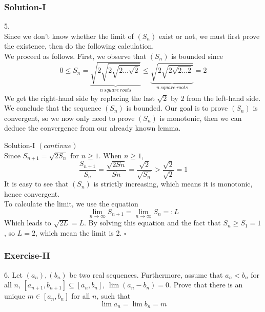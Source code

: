 \documentclass[12pt, t]{beamer}
\newcommand{\myqed}{\hfill$\square$}
\begin{document}
\begin{frame}
    \frametitle{Solution-I}
    5.\\
    \hspace{1em} Since we don't know whether the limit of $(S_n)$ exist or not, we must first prove the existence, then do the following
    calculation.\\
    \hspace{1em} We proceed as follows. First, we observe that $(S_n)$ is bounded since
    \begin{equation*}
        0\leq S_n=\underbrace{\sqrt{2\sqrt{2\sqrt{2\dots\sqrt{2}}}}}_{n\ square\ roots} \leq \underbrace{\sqrt{2\sqrt{2\sqrt{2\dots 2}}}}_{n\ square\ roots}=2
    \end{equation*}
    We get the right-hand side by replacing the last $\sqrt{2}$ by $2$
    from the left-hand side.\\
    \hspace{1em} We conclude that the sequence $(S_n)$ is bounded. Our goal is to prove $(S_n)$ is convergent, so we now only need to prove
    $(S_n)$ is monotonic, then we can deduce the convergence from our already known lemma.
\end{frame}

\begin{frame}{Solution-I}
    $(continue)$\\
    \hspace{1em} Since $S_{n+1}=\sqrt{2S_n}$ for $n\geq 1$. When $n\geq 1$,
    \begin{equation*}
        \frac{S_{n+1}}{S_n}=\frac{\sqrt{2Sn}}{Sn}=\frac{\sqrt{2}}{\sqrt{S_n}}>\frac{\sqrt{2}}{\sqrt{2}}=1
    \end{equation*}
    \hspace{1em} It is easy to see that $(S_n)$ is strictly increasing, which means it is monotonic,
    hence convergent.\\
    \hspace{1em} To calculate the limit, we use the equation
    \begin{equation*}
        \lim_{n\rightarrow\infty} S_{n+1}=\lim_{n\rightarrow\infty} S_n =: L
    \end{equation*}
    \hspace{1em} Which leads to $\sqrt{2L}=L$. By solving this equation and the fact that $S_n\geq S_1=1$, so $L=2$, which mean the limit is 2.
    \myqed
\end{frame}


\begin{frame}
    \frametitle{Exercise-II}
    6. Let $(a_n),(b_n)$ be two real sequences. Furthermore, assume that $a_n<b_n$
    for all $n$, $[a_{n+1}, b_{n+1}]\subseteq [a_n,b_n]$, $\lim (a_n-b_n)=0$. Prove that there
    is an unique $m\in [a_n,b_n]$ for all $n$, such that
    \begin{equation*}
        \lim a_n=\lim b_n=m
    \end{equation*}
\end{frame}
\end{document}
